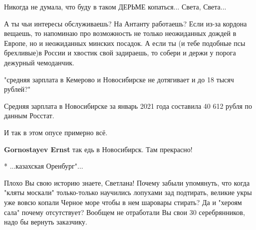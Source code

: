 \begin{itemize}
Никогда не думала, что буду в таком ДЕРЬМЕ копаться... Света, Света...

 

А ты чьи интересы обслуживаешь? На Антанту работаешь? Если из-за кордона
вещаешь, то напоминаю про возможность не только неожиданных дождей в Европе, но
и неожиданных минских посадок. А если ты (и тебе подобные псы брехливые)в
России и хвостик свой задираешь, то собери и держи у порога дежурный
чемоданчик.

 

"средняя зарплата в Кемерово и Новосибирске не дотягивает и до 18 тысяч
рублей?"

Средняя зарплата в Новосибирске за январь 2021 года составила 40 612 рубля по
данным Росстат.

И так в этом опусе примерно всё.

\begin{itemize}
 
\textbf{Gornostayev Ernst} так едь в Новосибирск. Там прекрасно!
\end{itemize}

 
* ...казахская Оренбург"...
\Laughey[1.0][white]\Laughey[1.0][white]

 

Плохо Вы свою историю знаете, Светлана! Почему забыли упомянуть, что когда
"кляты москали" только-только научились лопухами зад подтирать, великие укры
уже вовсю копали Черное море чтобы в нем шаровары стирать? Да и "хероям сала"
почему отсутствует? Вообщем не отработали Вы свои 30 серебрянников, надо бы
вернуть заказчику.


\end{itemize}
